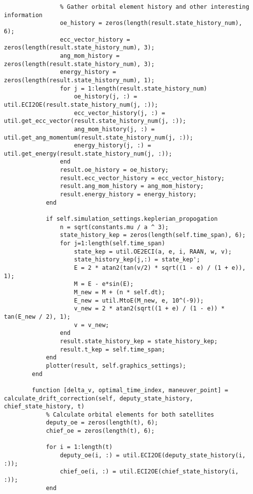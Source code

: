 \begin{lstlisting}
                % Gather orbital element history and other interesting information
                oe_history = zeros(length(result.state_history_num), 6);
                ecc_vector_history = zeros(length(result.state_history_num), 3);
                ang_mom_history = zeros(length(result.state_history_num), 3);
                energy_history = zeros(length(result.state_history_num), 1);
                for j = 1:length(result.state_history_num)
                    oe_history(j, :) = util.ECI2OE(result.state_history_num(j, :));
                    ecc_vector_history(j, :) = util.get_ecc_vector(result.state_history_num(j, :));
                    ang_mom_history(j, :) = util.get_ang_momentum(result.state_history_num(j, :));
                    energy_history(j, :) = util.get_energy(result.state_history_num(j, :));
                end
                result.oe_history = oe_history;
                result.ecc_vector_history = ecc_vector_history;
                result.ang_mom_history = ang_mom_history;
                result.energy_history = energy_history;
            end

            if self.simulation_settings.keplerian_propogation
                n = sqrt(constants.mu / a ^ 3);
                state_history_kep = zeros(length(self.time_span), 6);
                for j=1:length(self.time_span)
                    state_kep = util.OE2ECI(a, e, i, RAAN, w, v);
                    state_history_kep(j,:) = state_kep';
                    E = 2 * atan2(tan(v/2) * sqrt((1 - e) / (1 + e)), 1);
                    M = E - e*sin(E);
                    M_new = M + (n * self.dt);
                    E_new = util.MtoE(M_new, e, 10^(-9));
                    v_new = 2 * atan2(sqrt((1 + e) / (1 - e)) * tan(E_new / 2), 1);
                    v = v_new;
                end
                result.state_history_kep = state_history_kep;
                result.t_kep = self.time_span;
            end
            plotter(result, self.graphics_settings);
        end
        
        function [delta_v, optimal_time_index, maneuver_point] = calculate_drift_correction(self, deputy_state_history, chief_state_history, t)
            % Calculate orbital elements for both satellites
            deputy_oe = zeros(length(t), 6);
            chief_oe = zeros(length(t), 6);
            
            for i = 1:length(t)
                deputy_oe(i, :) = util.ECI2OE(deputy_state_history(i, :));
                chief_oe(i, :) = util.ECI2OE(chief_state_history(i, :));
            end
            

\end{lstlisting}
